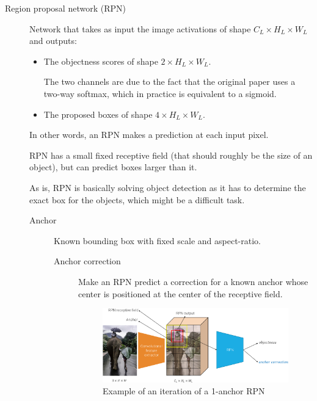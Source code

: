 \begin{description}
        \begin{description}
            \item[Region proposal network (RPN)] 
            Network that takes as input the image activations of shape $C_L \times H_L \times W_L$ and outputs:
            \begin{itemize}
                \item The objectness scores of shape $2 \times H_L \times W_L$.
                    \begin{remark}
                        The two channels are due to the fact that the original paper uses a two-way softmax, which in practice is equivalent to a sigmoid.
                    \end{remark}
                \item The proposed boxes of shape $4 \times H_L \times W_L$.
            \end{itemize}
            In other words, an RPN makes a prediction at each input pixel.

            \begin{remark}
                RPN has a small fixed receptive field (that should roughly be the size of an object), but can  predict boxes larger than it.
            \end{remark}

            \begin{remark}
                As is, RPN is basically solving object detection as it has to determine the exact box for the objects, which might be a difficult task.
            \end{remark}

            \begin{description}
                \item[Anchor] 
                    Known bounding box with fixed scale and aspect-ratio.

                \begin{description}
                    \item[Anchor correction] 
                        Make an RPN predict a correction for a known anchor whose center is positioned at the center of the receptive field.

                        \begin{figure}[H]
                            \raggedleft
                            \includegraphics[width=0.8\linewidth]{./img/_rpn_anchor.pdf}
                            \caption{Example of an iteration of a 1-anchor RPN}
                        \end{figure}


\end{description}
\end{description}
\end{description}
\end{description}

